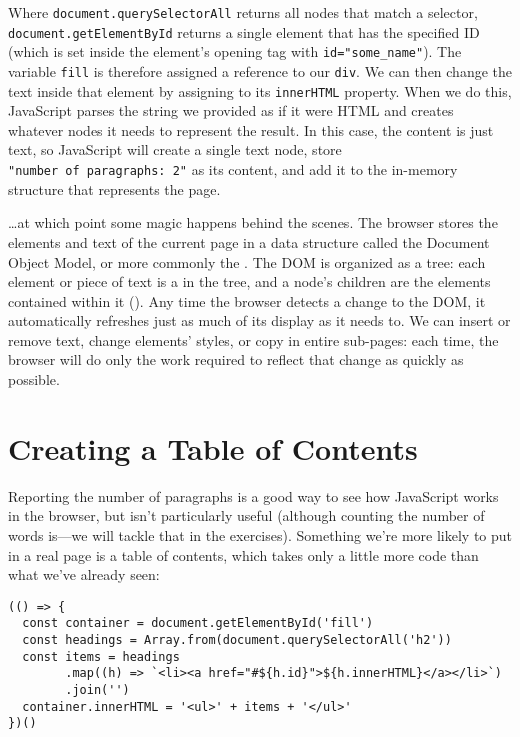 Where \texttt{document.querySelectorAll} returns all nodes that match a selector,
\texttt{document.getElementById} returns a single element that has the specified ID
(which is set inside the element's opening tag with \texttt{id="some\_name"}).
The variable \texttt{fill} is therefore assigned a reference to our \texttt{div}.
We can then change the text inside that element by assigning to its \texttt{innerHTML} property.
When we do this,
JavaScript parses the string we provided as if it were HTML
and creates whatever nodes it needs to represent the result.
In this case,
the content is just text,
so JavaScript will create a single text node,
store \texttt{"number\ of\ paragraphs:\ 2"} as its content,
and add it to the in-memory structure that represents the page.

\ldots{}at which point some magic happens behind the scenes.
The browser stores the elements and text of the current page in a data structure called
the Document Object Model,
or more commonly the .
The DOM is organized as a tree:
each element or piece of text is a  in the tree,
and a node's children are the elements contained within it ().
Any time the browser detects a change to the DOM,
it automatically refreshes just as much of its display as it needs to.
We can insert or remove text,
change elements' styles,
or copy in entire sub-pages:
each time,
the browser will do only the work required to reflect that change
as quickly as possible.


\section{Creating a Table of Contents}\label{s:pages-toc}

Reporting the number of paragraphs is a good way to see how JavaScript works in the browser,
but isn't particularly useful
(although counting the number of words is---we will tackle that in the exercises).
Something we're more likely to put in a real page is a table of contents,
which takes only a little more code than what we've already seen:

\begin{verbatim}
(() => {
  const container = document.getElementById('fill')
  const headings = Array.from(document.querySelectorAll('h2'))
  const items = headings
        .map((h) => `<li><a href="#${h.id}">${h.innerHTML}</a></li>`)
        .join('')
  container.innerHTML = '<ul>' + items + '</ul>'
})()
\end{verbatim}

